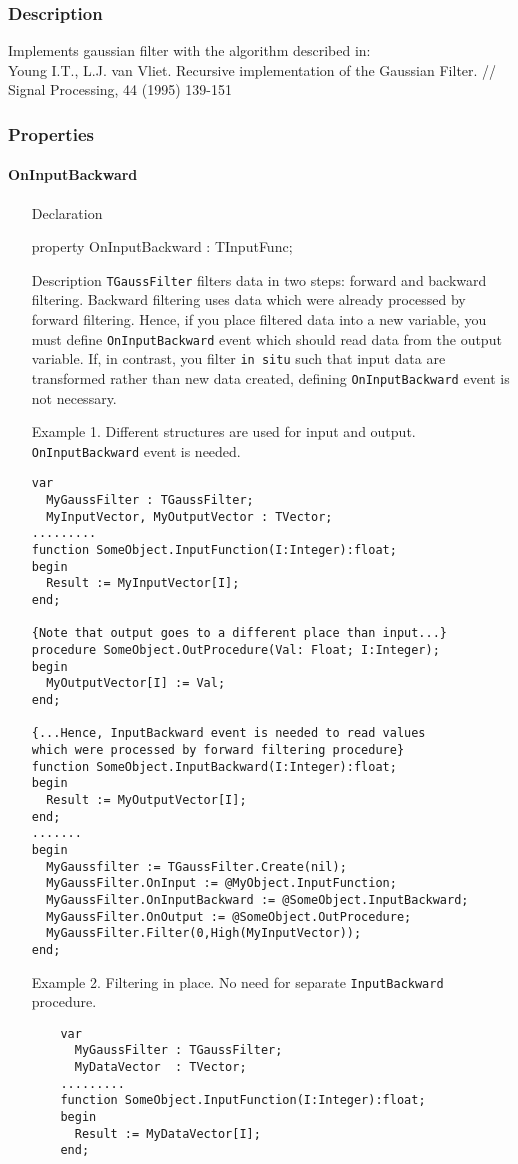 \documentclass[12pt,a4paper,oneside]{report}
\newcommand{\declarationitem}[1]{{\addfontfeatures{FakeSlant} #1}}
\newcommand{\descriptiontitle}[1]{{\addfontfeatures{FakeSlant}#1}}
\newcommand{\code}[1]{\texttt{#1}}
\begin{document}
\subsubsection{Description}
Implements gaussian filter with the algorithm described in:\\
Young I.T., L.J. van Vliet. Recursive implementation of the Gaussian Filter. // Signal Processing, 44 (1995) 139-151
\subsubsection{Properties}
\label{lmFilters:OnInputBackward}
\paragraph{OnInputBackward}
\begin{itemize}
	\item[\declarationitem{Declaration}\hfill]
	\begin{flushleft}
	property OnInputBackward : TInputFunc;	
	\end{flushleft}
	\item[\descriptiontitle{Description}] \code{TGaussFilter} filters data in two steps: forward and backward filtering. Backward filtering uses data which were already processed by forward filtering. Hence, if you place filtered data into a new variable, you must define \code{OnInputBackward} event which should read data from the output variable. If, in contrast, you filter \code{in situ} such that input data are transformed rather than new data created, defining \code{OnInputBackward} event is not necessary.
	\item[\descriptiontitle{Example 1.}] Different structures are used for input and output. \code{OnInputBackward} event is needed.
	\begin{verbatim}
var
  MyGaussFilter : TGaussFilter;
  MyInputVector, MyOutputVector : TVector;
.........
function SomeObject.InputFunction(I:Integer):float;
begin
  Result := MyInputVector[I];
end;

{Note that output goes to a different place than input...}
procedure SomeObject.OutProcedure(Val: Float; I:Integer);
begin
  MyOutputVector[I] := Val;
end;

{...Hence, InputBackward event is needed to read values
which were processed by forward filtering procedure}
function SomeObject.InputBackward(I:Integer):float;
begin
  Result := MyOutputVector[I];
end;
.......
begin
  MyGaussfilter := TGaussFilter.Create(nil);
  MyGaussFilter.OnInput := @MyObject.InputFunction;
  MyGaussFilter.OnInputBackward := @SomeObject.InputBackward;
  MyGaussFilter.OnOutput := @SomeObject.OutProcedure;
  MyGaussFilter.Filter(0,High(MyInputVector));
end;
	\end{verbatim} 
	\item[\descriptiontitle{Example 2.}] Filtering in place. No need for separate \code{InputBackward} procedure.
	\begin{verbatim}
	var
	  MyGaussFilter : TGaussFilter;
	  MyDataVector  : TVector;
	.........
	function SomeObject.InputFunction(I:Integer):float;
	begin
	  Result := MyDataVector[I];
	end;
	

\end{verbatim}
\end{itemize}
\end{document}
